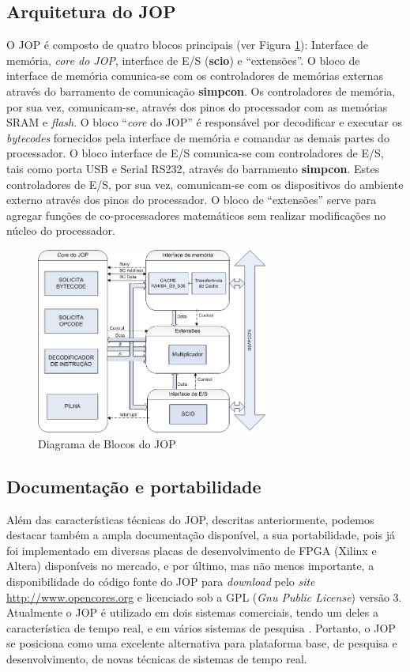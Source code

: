 \documentclass[10pt,twocolumn]{article}
\begin{document}
\subsection{Arquitetura do JOP}
	O JOP é composto de quatro blocos principais (ver Figura \ref{bdjop}): Interface de memória, \emph{core do JOP}, interface de E/S (\textbf{scio}) e ``extensões''. O bloco de interface de memória comunica-se com os controladores de memórias externas através do barramento de comunicação \textbf{simpcon}. Os controladores de memória, por sua vez, comunicam-se, através dos pinos do processador com as memórias SRAM e \emph{flash}. O bloco ``\emph{core} do JOP'' é responsável por de\-co\-di\-fi\-car e executar os \emph{bytecodes} fornecidos pela interface de memória e comandar as demais partes do processador. O bloco interface de E/S comunica-se com controladores de E/S, tais como porta USB e Serial RS232, através do barramento \textbf{simpcon}. Estes controladores de E/S, por sua vez, comunicam-se com os dispositivos do ambiente externo através dos pinos do processador. O bloco de ``extensões'' serve para agregar funções de co-processadores matemáticos sem realizar modificações no núcleo do processador.

\begin{figure}[!t]
\centering

\includegraphics[width=3.0in]{arch_jop_block_port}

\caption{Diagrama de Blocos do JOP}
\label{bdjop}

\end{figure}
\subsection{Documentação e portabilidade}	
	Além das características técnicas do JOP, descritas anteriormente, podemos destacar também a ampla documentação disponível, a sua portabilidade, pois já foi implementado em diversas placas de desenvolvimento de FPGA (Xilinx e Altera) disponíveis no mercado, e por último, mas não menos importante, a disponibilidade do código fonte do JOP para \emph{download} pelo \emph{site} \url {http://www.opencores.org} e licenciado sob a GPL (\emph{Gnu Public License}) versão 3.
 Atualmente o JOP é utilizado em dois sistemas comerciais, tendo um deles a característica de tempo real, e em vários sistemas de pesquisa \cite{jop:jnl:jsa2007}. Portanto, o JOP se posiciona como uma excelente alternativa para plataforma base, de pesquisa e desenvolvimento, de novas técnicas de sistemas de tempo real.
\end{document}
